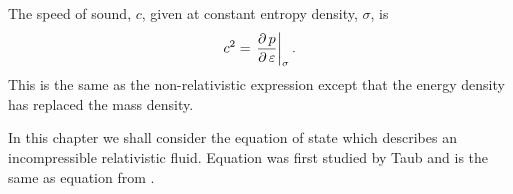 The speed of sound, $c$,  given at constant entropy density, $\sigma$, is\cite{LandauBook,Taub1978} 
\begin{align}
  c^2 = \left.{\frac{\operatorname{\partial} p}{\operatorname{\partial} \varepsilon}}\right|_{\sigma}. \label{eqn:soundspeed}
\end{align}
This is the same as the non-relativistic expression except that the energy density has replaced the mass density.

In this chapter we shall consider the equation of state
which describes an incompressible relativistic fluid.
Equation  was first studied by Taub\cite{Taub1978}
and is the same as equation \eqnref{} from \secref{}.




